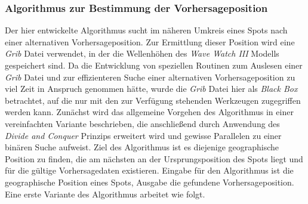 \subsubsection{Algorithmus zur Bestimmung der Vorhersageposition}
Der hier entwickelte Algorithmus sucht im näheren Umkreis eines Spots
nach einer alternativen Vorhersageposition. Zur Ermittlung dieser
Position wird eine \textit{Grib} Datei verwendet, in der die
Wellenhöhen des \textit{Wave Watch III} Modells gespeichert sind. Da
die Entwicklung von speziellen Routinen zum Auslesen einer
\textit{Grib} Datei und zur effizienteren Suche einer alternativen
Vorhersageposition zu viel Zeit in Anspruch genommen hätte, wurde die
\textit{Grib} Datei hier als \textit{Black Box} betrachtet, auf die
nur mit den zur Verfügung stehenden Werkzeugen zugegriffen werden
kann. Zunächst wird das allgemeine Vorgehen des Algorithmus in einer
vereinfachten Variante beschrieben, die anschließend durch Anwendung
des \textit{Divide and Conquer} Prinzips erweitert wird und gewisse
Parallelen zu einer binären Suche aufweist. Ziel des Algorithmus ist
es diejenige geographische Position zu finden, die am nächsten an der
Ursprungsposition des Spots liegt und für die gültige Vorhersagedaten
existieren. Eingabe für den Algorithmus ist die geographische Position
eines Spots, Ausgabe die gefundene Vorhersageposition. Eine erste
Variante des Algorithmus arbeitet wie folgt.

